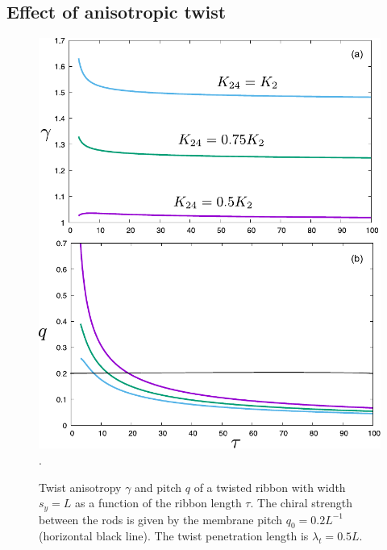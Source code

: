 \subsection{Effect of anisotropic twist} 

\begin{figure}
\begin{center}
\includegraphics[width=  0.5 \columnwidth]{figures/chapter-5/raniso}.
\caption{ \label{fig3} Twist anisotropy $\gamma$ and pitch $q$ of a twisted ribbon with width $s_{y} = L$ as a function of the ribbon length $\tau$. The chiral strength between the rods is given by the membrane pitch $q_{0} = 0.2L^{-1}$ (horizontal black line). The twist penetration length is $\lambda_{t} = 0.5L $.   }
\end{center}
\end{figure}


